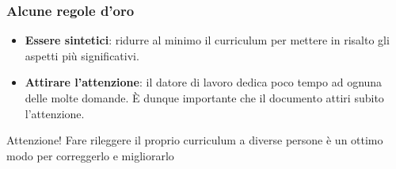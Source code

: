 \documentclass[svgnames,%
	ucs,%
	pdftex]{guitbeamer}
\begin{document}
\begin{frame}
  \frametitle{Alcune regole d'oro}
	\begin{itemize}
	\item \textbf{Essere sintetici}: ridurre al minimo il curriculum per mettere in risalto gli aspetti pi\`u significativi.
		\item \textbf{Attirare l'attenzione}: il datore di lavoro dedica poco tempo ad ognuna delle molte domande. \`E dunque importante che il documento attiri subito l'attenzione. %
	\end{itemize}
  \smallskip
	\begin{block}{Attenzione!}
	Fare rileggere il proprio curriculum a diverse persone \`e un ottimo modo per correggerlo e migliorarlo
	\end{block}
\end{frame}
\end{document}
